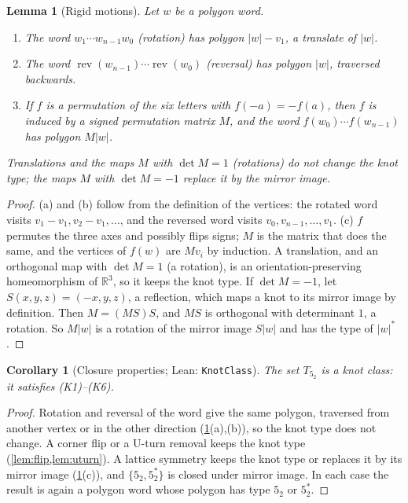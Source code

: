 \documentclass[11pt]{article}
\theoremstyle{plain}
\newtheorem{lemma}[theorem]{Lemma}
\newtheorem{corollary}[theorem]{Corollary}
\theoremstyle{definition}
\theoremstyle{remark}
\newcommand{\R}{\mathbb{R}}
\newcommand{\lean}[1]{\texttt{#1}}
\newcommand{\rev}{\operatorname{rev}}
\begin{document}
\begin{lemma}[Rigid motions]\label{lem:rigid}
Let $w$ be a polygon word.
\begin{enumerate}[label=(\alph*)]
\item The word $w_1\cdots w_{n-1}w_0$ (\emph{rotation}) has polygon $|w|-v_1$, a translate of $|w|$.
\item The word $\rev(w_{n-1})\cdots\rev(w_0)$ (\emph{reversal}) has polygon $|w|$, traversed backwards.
\item If $f$ is a permutation of the six letters with $f(-a)=-f(a)$, then $f$ is induced by a signed
permutation matrix $M$, and the word $f(w_0)\cdots f(w_{n-1})$ has polygon $M|w|$.
\end{enumerate}
Translations and the maps $M$ with $\det M=1$ (rotations) do not change the knot type; the maps $M$
with $\det M=-1$ replace it by the mirror image.
\end{lemma}
\begin{proof}
(a) and (b) follow from the definition of the vertices: the rotated word visits $v_1-v_1,v_2-v_1,\dots$,
and the reversed word visits $v_0,v_{n-1},\dots,v_1$. (c) $f$ permutes the three axes and possibly flips
signs; $M$ is the matrix that does the same, and the vertices of $f(w)$ are $Mv_i$ by induction. A
translation, and an orthogonal map with $\det M=1$ (a rotation), is an orientation-preserving
homeomorphism of $\R^3$, so it keeps the knot type. If $\det M=-1$, let $S(x,y,z)=(-x,y,z)$, a
reflection, which maps a knot to its mirror image by definition. Then $M=(MS)S$, and $MS$ is orthogonal
with determinant $1$, a rotation. So $M|w|$ is a rotation of the mirror image $S|w|$ and has the type
of $|w|^*$.
\end{proof}

\begin{corollary}[Closure properties; Lean: \lean{KnotClass}]\label{cor:knotclass}
The set $T_{5_2}$ is a knot class: it satisfies (K1)--(K6).
\end{corollary}
\begin{proof}
Rotation and reversal of the word give the same polygon, traversed from another vertex or in the other
direction (\cref{lem:rigid}(a),(b)), so the knot type does not change. A corner flip or a U-turn
removal keeps the knot type (\cref{lem:flip,lem:uturn}). A lattice symmetry keeps the knot type or
replaces it by its mirror image (\cref{lem:rigid}(c)), and $\{5_2,5_2^*\}$ is closed under mirror
image. In each case the result is again a polygon word whose polygon has type $5_2$ or $5_2^*$.
\end{proof}
\end{document}
